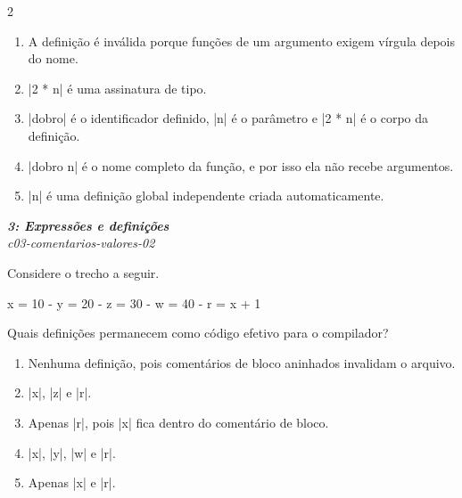 \documentclass[a4paper,10pt,brazil]{article}
\begin{document}
\begin{multicols}{2}
\begin{enumerate}
  \item A definição é inválida porque funções de um argumento exigem vírgula depois do nome.

  \item \haskellinline|2 * n| é uma assinatura de tipo.

  \item \haskellinline|dobro| é o identificador definido, \haskellinline|n| é o parâmetro e \haskellinline|2 * n| é o corpo da definição.

  \item \haskellinline|dobro n| é o nome completo da função, e por isso ela não recebe argumentos.

  \item \haskellinline|n| é uma definição global independente criada automaticamente.


\end{enumerate}

\begin{flushright}
  \footnotesize
  \textit{\textbf{3: Expressões e definições}}\\
  \textit{c03-comentarios-valores-02}\\

\end{flushright}
Considere o trecho a seguir.

\begin{haskellcode}
x = 10
{-
y = 20
  {- z = 30 -}
w = 40
-}
r = x + 1
\end{haskellcode}

Quais definições permanecem como código efetivo para o compilador?

\begin{enumerate}
  \item Nenhuma definição, pois comentários de bloco aninhados invalidam o arquivo.

  \item \haskellinline|x|, \haskellinline|z| e \haskellinline|r|.

  \item Apenas \haskellinline|r|, pois \haskellinline|x| fica dentro do comentário de bloco.

  \item \haskellinline|x|, \haskellinline|y|, \haskellinline|w| e \haskellinline|r|.

  \item Apenas \haskellinline|x| e \haskellinline|r|.



\end{enumerate}
\end{multicols}
\end{document}
